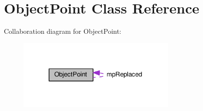 \hypertarget{classObjectPoint}{}\section{Object\+Point Class Reference}
\label{classObjectPoint}


Collaboration diagram for Object\+Point\+:\nopagebreak
\begin{figure}[H]
\begin{center}
\leavevmode
\includegraphics[width=224pt]{classObjectPoint__coll__graph}
\end{center}
\end{figure}
